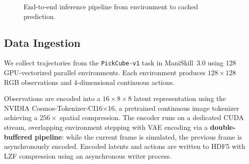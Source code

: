 \documentclass[letterpaper,twocolumn,10pt]{article}
\begin{document}
\begin{figure}[t]
\centering
{}
\caption{End-to-end inference pipeline from environment to cached prediction.}
\label{fig:pipeline}
\end{figure}



\subsection{Data Ingestion}

We collect trajectories from the \texttt{PickCube-v1} task in
ManiSkill~3.0 using 128 GPU-vectorized parallel environments.  Each environment produces $128\times128$ RGB observations and 4-dimensional continuous actions.

Observations are encoded into a $16\times8\times8$ latent
representation using the NVIDIA Cosmos-Tokenizer-CI16$\times$16, a pretrained continuous image tokenizer achieving a $256\times$ spatial compression.  The encoder runs on a dedicated CUDA stream, overlapping environment stepping with VAE encoding via a \textbf{double-buffered
pipeline}: while the current frame is simulated, the previous frame is asynchronously encoded.  Encoded latents and actions are written to HDF5 with LZF compression using an asynchronous writer process.
\end{document}
